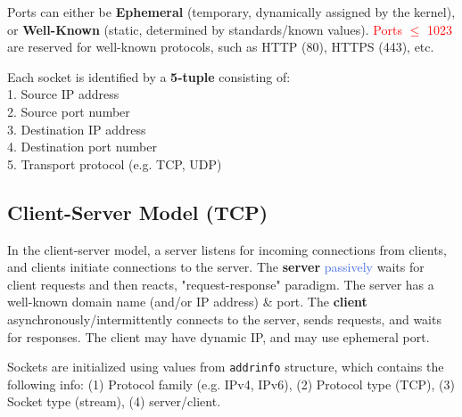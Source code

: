 \documentclass[openany,12pt]{book}
\newcommand{\code}[1]{\texttt{#1}}
\newcommand{\red}[1]{\textcolor{Red}{#1}}
\newcommand{\blue}[1]{\textcolor{RoyalBlue}{#1}}
\begin{document}
Ports can either be \textbf{Ephemeral} (temporary, dynamically assigned by the kernel), or \textbf{Well-Known} (static, determined by standards/known values). \red{Ports \(\leq\) 1023} are reserved for well-known protocols, such as HTTP (80), HTTPS (443), etc.

Each socket is identified by a \textbf{5-tuple} consisting of: \\
1. Source IP address \\
2. Source port number \\
3. Destination IP address \\
4. Destination port number \\
5. Transport protocol (e.g. TCP, UDP)


\subsection*{Client-Server Model (TCP)}
In the client-server model, a server listens for incoming connections from clients, and clients initiate connections to the server. The \textbf{server} \blue{passively} waits for client requests and then reacts, "request-response" paradigm. The server has a well-known domain name (and/or IP address) \& port. The \textbf{client} asynchronously/intermittently connects to the server, sends requests, and waits for responses. The client may have dynamic IP, and may use ephemeral port.

Sockets are initialized using values from \code{addrinfo} structure, which contains the following info: (1) Protocol family (e.g. IPv4, IPv6), (2) Protocol type (TCP), (3) Socket type (stream), (4) server/client.
\end{document}
